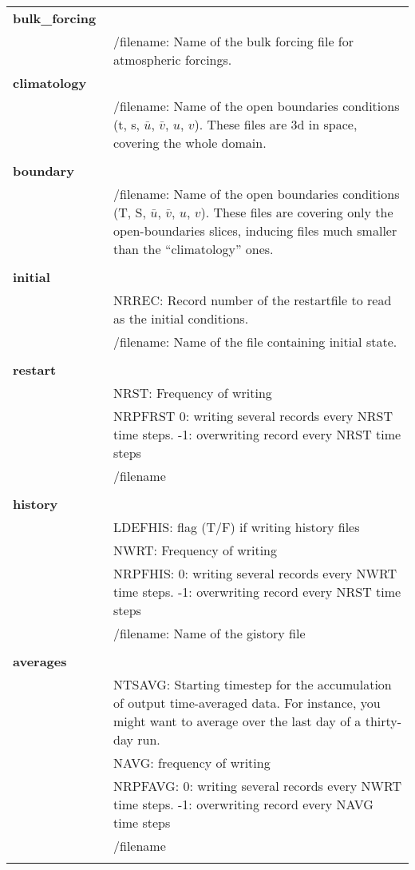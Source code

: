 \begin{longtable}{|p{0.25\linewidth}|p{0.75\linewidth}|}
\large{\textbf{bulk\_forcing}}    &  \\ 
&/filename:  Name of the bulk forcing file for atmospheric forcings.\\ 


\large{\textbf{climatology} }   &  \\
&/filename: Name of the open boundaries conditions (t, s, $\bar u$, $\bar v$, $u$,
$v$). These files are 3d in space, covering the whole domain. \\ 
&  \\ 


\large{\textbf{boundary}} &  \\
&/filename: Name of the open boundaries conditions (T, S, $\bar u$, $\bar v$, $u$,
$v$). These files are covering only the open-boundaries slices, inducing files much
smaller than the ``climatology'' ones.    \\ 
&  \\ 

\large{\textbf{initial}} &     \\ 
&  NRREC: Record number of the restartfile to read as the initial conditions.    \\ 
& /filename: Name of the file containing initial state.\\ 
&  \\ 



\large{\textbf{restart}} &     \\ 
&   NRST:      Frequency of writing\\ 
&   NRPFRST   0: writing several records every NRST time steps. -1: overwriting record
every NRST time steps\\ 
&  /filename  \\ 
&  \\ 

\large{\textbf{history}} &     \\ 
&  LDEFHIS: flag (T/F) if writing history files  \\ 
&  NWRT: Frequency of writing \\ 
&  NRPFHIS: 0: writing several records every NWRT time steps. -1: overwriting record
every NRST time steps   \\ 
&  /filename: Name of the gistory file  \\ 
&  \\ 


\large{\textbf{averages}} &     \\ 
&   NTSAVG: Starting timestep for the accumulation of output time-averaged data. For
instance, you might want to average over the last day of a thirty-day run.  \\ 
&   NAVG: frequency of writing \\ 
&   NRPFAVG: 0: writing several records every NWRT time steps. -1: overwriting record
every NAVG time steps  \\ 
&  /filename  \\ 
&  \\ 



\end{longtable}
